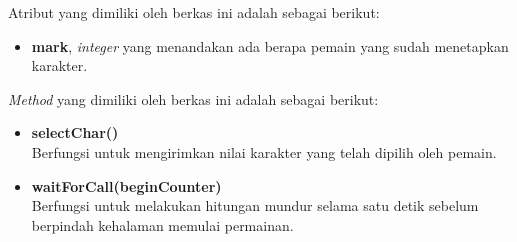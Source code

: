 \begin{enumerate}
\begin{enumerate}
\begin{enumerate}
			Atribut yang dimiliki oleh berkas ini adalah sebagai berikut:
			\begin{itemize}
				\item \textbf{mark}, \textit{integer} yang menandakan ada berapa pemain yang sudah menetapkan karakter.
			\end{itemize}
		
			\textit{Method} yang dimiliki oleh berkas ini adalah sebagai berikut:
			\begin{itemize}
				\item \textbf{selectChar()} \\
				Berfungsi untuk mengirimkan nilai karakter yang telah dipilih oleh pemain.
				
				\item \textbf{waitForCall(beginCounter)} \\ Berfungsi untuk melakukan hitungan mundur selama satu detik sebelum berpindah kehalaman memulai permainan.
			\end{itemize}
			

\end{enumerate}
\end{enumerate}
\end{enumerate}

